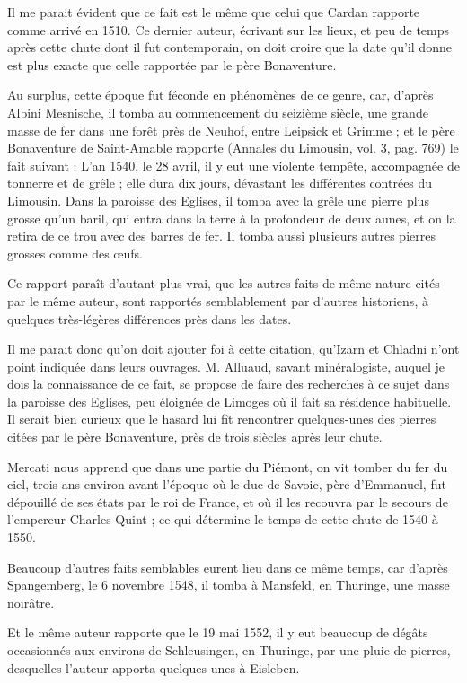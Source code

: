 \documentclass[a4paper, 12pt, oneside, french]{article}
\begin{document}
Il me parait évident que ce fait est le même que celui que Cardan rapporte comme arrivé en 1510. Ce dernier auteur, écrivant sur les lieux, et peu de temps après cette chute dont il fut contemporain, on doit croire que la date qu'il donne est plus exacte que celle rapportée par le père Bonaventure.

Au surplus, cette époque fut féconde en phénomènes de ce genre, car, d'après Albini Mesnische, il tomba au commencement du seizième siècle, une grande masse de fer dans une forêt près de Neuhof, entre Leipsick et Grimme ; et le père Bonaventure de Saint-Amable rapporte (Annales du Limousin, vol. 3, pag. 769) le fait suivant : \og L'an 1540, le 28 avril, il y eut une violente tempête, accompagnée de tonnerre et de grêle ; elle dura dix jours, dévastant les différentes contrées du Limousin. Dans la paroisse des Eglises, il tomba avec la grêle une pierre plus grosse qu'un baril, qui entra dans la terre à la profondeur de deux aunes, et on la retira de ce trou avec des barres de fer. Il tomba aussi plusieurs autres pierres grosses comme des œufs. \fg

Ce rapport paraît d'autant plus vrai, que les autres faits de même nature cités par le même auteur, sont rapportés semblablement par d'autres historiens, à quelques très-légères différences près dans les dates.

Il me parait donc qu'on doit ajouter foi à cette citation, qu'Izarn et Chladni n'ont point indiquée dans leurs ouvrages. M. Alluaud, savant minéralogiste, auquel je dois la connaissance de ce fait, se propose de faire des recherches à ce sujet dans la paroisse des Eglises, peu éloignée de Limoges où il fait sa résidence habituelle. Il serait bien curieux que le hasard lui fît rencontrer quelques-unes des pierres citées par le père Bonaventure, près de trois siècles après leur chute.

Mercati nous apprend que dans une partie du Piémont, on vit tomber du fer du ciel, trois ans environ avant l'époque où le duc de Savoie, père d'Emmanuel, fut dépouillé de ses états par le roi de France, et où il les recouvra par le secours de l'empereur Charles-Quint ; ce qui détermine le temps de cette chute de 1540 à 1550.

Beaucoup d'autres faits semblables eurent lieu dans ce même temps, car d'après Spangemberg, le 6 novembre 1548, il tomba à Mansfeld, en Thuringe, une masse noirâtre.

Et le même auteur rapporte que le 19 mai 1552, il y eut beaucoup de dégâts occasionnés aux environs de Schleusingen, en Thuringe, par une pluie de pierres, desquelles l'auteur apporta quelques-unes à Eisleben.
\end{document}
